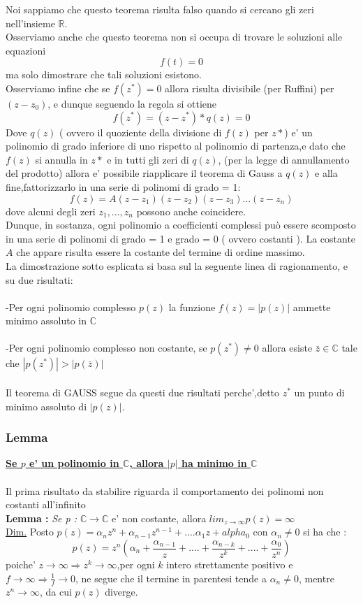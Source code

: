 \documentclass[fontsize = 20px, paper = a4]{article}
\begin{document}
Noi sappiamo che questo teorema risulta falso quando si cercano gli zeri nell'insieme $\mathbb{R}$.\\
Osserviamo anche che questo teorema non si occupa di trovare le soluzioni alle equazioni $$f(t) = 0$$ ma solo dimostrare che tali soluzioni esistono.\\
Osserviamo infine che se $f(z^*) = 0$ allora risulta divisibile (per Ruffini) per $(z - z_{0})$, e dunque seguendo la regola si ottiene $$f(z^*) = (z - z^*) * q(z) = 0$$
Dove $q(z)$ ( ovvero il quoziente della divisione di $f(z)$ per $z*$) e' un polinomio di grado inferiore di uno rispetto al polinomio di partenza,e dato che $f(z)$ si annulla in $z*$ e in tutti gli zeri di $q(z)$, (per la legge di annullamento del prodotto) allora e' possibile riapplicare il teorema di Gauss a $q(z)$ e alla fine,fattorizzarlo in una serie di polinomi di grado = 1: $$f(z) = A(z-z_{1})(z-z_{2})(z-z_{3})...(z-z_{n})$$ dove alcuni degli zeri $z_{1},...,z_{n}$ possono anche coincidere.\\
Dunque, in sostanza, ogni polinomio a coefficienti complessi può essere scomposto in una serie di polinomi di grado = 1 e grado = 0 ( ovvero costanti ). La costante $A$ che appare risulta essere la costante del termine di ordine massimo.\\
La dimostrazione sotto esplicata si basa sul la seguente linea di ragionamento, e su due risultati:\\\\
\indent -Per ogni polinomio complesso $p(z)$ la funzione $f(z) = | p(z) |$ ammette \\ \indent           minimo assoluto in $\mathbb{C}$ \\\\
\indent -Per ogni polinomio complesso non costante, se $p(z^*) \neq 0$ allora esiste $\bar{z}\in \mathbb{C}$ \indent tale che $|p(z^*)| >|p(\bar{z})|$   \\ \\
Il teorema di GAUSS segue da questi due risultati perche',detto $z^*$ un punto di minimo assoluto di $|p(z)|$.\\
\subsubsection{Lemma}
\textbf{\underline{Se $p$ e' un polinomio in $\mathbb{C}$, allora $|p|$ ha minimo in $\mathbb{C}$}}\\\\
Il prima risultato da stabilire riguarda il comportamento dei polinomi non costanti all'infinito\\
\textbf{Lemma :} \textit{Se p : $\mathbb{C}\rightarrow \mathbb{C}$} e' non costante, allora $lim_{z \to \infty} p(z) = \infty $ \\
\underline{Dim.} Posto $p(z) = \alpha_{n}z^n + \alpha_{n-1}z^{n-1} +....\alpha_{1}z + alpha_{0}$ con $\alpha_{n} \neq 0$ si ha che :
$$p(z) = z^n(\alpha_{n} + \frac{\alpha_{n-1}}{z} + .... +\frac{\alpha_{n-k}}
{z^k} + .... +\frac{\alpha_{0}}{z^n}) $$
poiche' $ z \to \infty \Longrightarrow z^k \to \infty$,per ogni $k$ intero strettamente positivo e $f\rightarrow \infty \Longrightarrow \frac{1}{f} \rightarrow 0$, ne segue che il termine in parentesi tende a $\alpha_{n} \neq 0$, mentre $z^n \to \infty$, da cui $p(z)$ diverge.
\end{document}
